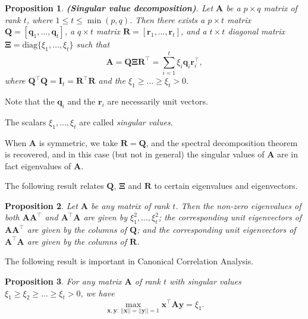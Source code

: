 \documentclass[]{book}
\newtheorem{proposition}{Proposition}[chapter]
\theoremstyle{definition}
\theoremstyle{definition}
\theoremstyle{definition}
\theoremstyle{remark}
\begin{document}
\begin{proposition}
\protect\hypertarget{prp:unnamed-chunk-10}{}{\label{prp:unnamed-chunk-10} }\textbf{(Singular value decomposition)}.
Let \(\boldsymbol A\) be a \(p \times q\) matrix of rank \(t\), where \(1 \leq t \leq \min(p,q)\). Then there exists a \(p \times t\) matrix \(\boldsymbol Q=[\boldsymbol q_1,\ldots , \boldsymbol q_t]\), a \(q \times t\) matrix \(\boldsymbol R=[{\mathbf r}_1,\ldots ,{ \mathbf r}_t]\), and a \(t \times t\) diagonal matrix \({\mathbf \Xi}=\text{diag}\{\xi_1,\ldots , \xi_t\}\) such that
\[
\boldsymbol A=\boldsymbol Q{\mathbf \Xi} \boldsymbol R^\top =\sum_{i=1}^t \xi_i \boldsymbol q_i {\mathbf r}_i^\top,
\]
where \(\boldsymbol Q^\top \boldsymbol Q= \boldsymbol I_t = \boldsymbol R^\top \boldsymbol R\) and the \(\xi_1 \geq \ldots \geq \xi_t >0\).
\end{proposition}

Note that the \(\boldsymbol q_i\) and the \({\mathbf r}_i\) are necessarily unit vectors.

The scalars \(\xi_1, \ldots , \xi_t\) are called \emph{singular values}.

When \(\boldsymbol A\) is symmetric, we take \({\mathbf R}=\boldsymbol Q\), and the spectral decomposition theorem is recovered, and in this case (but not in general) the singular values of \(\boldsymbol A\) are in fact eigenvalues of \(\boldsymbol A\).

The following result relates \(\mathbf Q\), \(\mathbf \Xi\) and \(\mathbf R\) to certain eigenvalues and eigenvectors.

\begin{proposition}
\protect\hypertarget{prp:unnamed-chunk-11}{}{\label{prp:unnamed-chunk-11} }Let \(\boldsymbol A\) be any matrix of rank \(t\). Then the non-zero eigenvalues of both \(\boldsymbol A\boldsymbol A^\top\) and \(\boldsymbol A^\top \boldsymbol A\) are given by \(\xi_1^2, \ldots , \xi_t^2\); the corresponding unit eigenvectors of \(\boldsymbol A\boldsymbol A^\top\) are given by the columns of \(\mathbf Q\); and the corresponding unit eigenvectors of \(\boldsymbol A^\top \boldsymbol A\) are given by the columns of \(\mathbf R\).
\end{proposition}

The following result is important in Canonical Correlation Analysis.

\begin{proposition}
\protect\hypertarget{prp:unnamed-chunk-12}{}{\label{prp:unnamed-chunk-12} }For any matrix \(\boldsymbol A\) of rank \(t\) with singular values \(\xi_1 \geq \xi_2 \geq \ldots \geq \xi_t >0\), we have
\[
\max_{\boldsymbol x, \boldsymbol y:\, \vert \vert \boldsymbol x\vert \vert=\vert \vert \boldsymbol y\vert \vert =1} \boldsymbol x^\top \boldsymbol A\boldsymbol y=\xi_1.
\]
\end{proposition}
\end{document}
